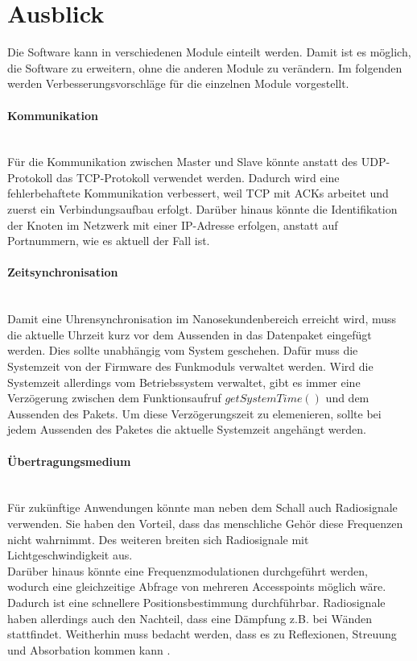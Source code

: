 \newpage

\section{Ausblick}
Die Software kann in verschiedenen Module einteilt werden. Damit ist es möglich, die Software zu erweitern, ohne die anderen Module zu verändern. Im folgenden werden Verbesserungsvorschläge für die einzelnen Module vorgestellt.

\paragraph{Kommunikation}\mbox{}\\
Für die Kommunikation zwischen Master und Slave könnte anstatt des UDP-Protokoll das TCP-Protokoll verwendet werden. Dadurch wird eine fehlerbehaftete Kommunikation verbessert, weil TCP mit ACKs arbeitet und zuerst ein Verbindungsaufbau erfolgt. Darüber hinaus könnte die Identifikation der Knoten im Netzwerk mit einer IP-Adresse erfolgen, anstatt auf Portnummern, wie es aktuell der Fall ist.

\paragraph{Zeitsynchronisation}\mbox{}\\
Damit eine Uhrensynchronisation im Nanosekundenbereich erreicht wird, muss die aktuelle Uhrzeit kurz vor dem Aussenden in das Datenpaket eingefügt werden. Dies sollte unabhängig vom System geschehen. Dafür muss die Systemzeit von der Firmware des Funkmoduls verwaltet werden. Wird die Systemzeit allerdings vom Betriebssystem verwaltet, gibt es immer eine Verzögerung zwischen dem Funktionsaufruf $getSystemTime()$ und dem Aussenden des Pakets. Um diese Verzögerungszeit zu elemenieren, sollte bei jedem Aussenden des Paketes die aktuelle Systemzeit angehängt werden.

\paragraph{Übertragungsmedium}\mbox{}\\
Für zukünftige Anwendungen könnte man neben dem Schall auch Radiosignale verwenden. Sie haben den Vorteil, dass das menschliche Gehör diese Frequenzen nicht wahrnimmt. Des weiteren breiten sich Radiosignale mit Lichtgeschwindigkeit aus.
\\
Darüber hinaus könnte eine Frequenzmodulationen durchgeführt werden, wodurch eine gleichzeitige Abfrage von mehreren Accesspoints möglich wäre. Dadurch ist eine schnellere Positionsbestimmung durchführbar. Radiosignale haben allerdings auch den Nachteil, dass eine Dämpfung z.B. bei Wänden stattfindet. Weitherhin muss bedacht werden, dass es zu Reflexionen, Streuung und Absorbation kommen kann \cite{src_RADIOSIGNALE}.

